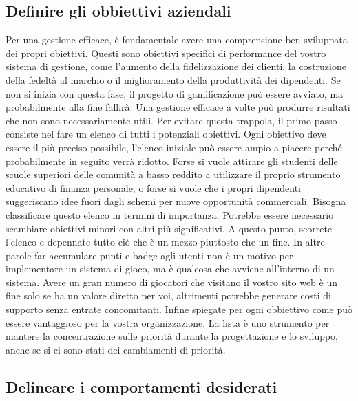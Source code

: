 \begin{itemize}
\subsection{Definire gli obbiettivi aziendali}

Per una gestione efficace, è fondamentale avere una comprensione ben sviluppata dei propri obiettivi.
Questi sono obiettivi specifici di performance del vostro sistema di gestione, come l'aumento della fidelizzazione dei clienti, la costruzione della fedeltà al marchio o il miglioramento della produttività dei dipendenti. Se non si inizia con questa fase, il progetto di gamificazione può essere avviato, ma probabilmente alla fine fallirà. Una gestione efficace a volte può produrre risultati che non sono necessariamente utili. Per evitare questa trappola, il primo passo consiste nel fare un elenco di tutti i potenziali obiettivi. Ogni obiettivo deve essere il più preciso possibile, l'elenco iniziale può essere ampio a piacere perché probabilmente in seguito verrà ridotto. Forse si vuole attirare gli studenti delle scuole superiori delle comunità a basso reddito a utilizzare il proprio strumento educativo di finanza personale, o forse si vuole che i propri dipendenti suggeriscano idee fuori dagli schemi per nuove opportunità commerciali. Bisogna classificare questo elenco in termini di importanza. Potrebbe essere necessario scambiare obiettivi minori con altri più significativi. A questo punto, scorrete l'elenco e depennate tutto ciò che è un mezzo piuttosto che un fine. In altre parole far accumulare punti e badge agli utenti non è un motivo per implementare un sistema di gioco, ma è qualcosa che avviene all'interno di un sistema. Avere un gran numero di giocatori che visitano il vostro sito web è un fine solo se ha un valore diretto per voi, altrimenti potrebbe generare costi di supporto senza entrate concomitanti. Infine spiegate per ogni obbiettivo come può essere vantaggioso per la vostra organizzazione. La lista è uno strumento per mantere la concentrazione sulle priorità durante la progettazione e lo sviluppo, anche se si ci sono stati dei cambiamenti di priorità.

\subsection{Delineare i comportamenti desiderati}


\end{itemize}
